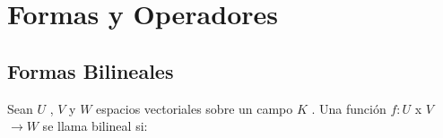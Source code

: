 \setlength{\parskip}{\baselineskip}%

\chapter{Formas y Operadores}
	\section{Formas Bilineales}

 Sean  $ U $ ,  $ V $  y  $ W $  espacios vectoriales sobre un campo  $ K $ .
Una función $ f:U $ x $ V $ $ \rightarrow W $ se llama bilineal si:

